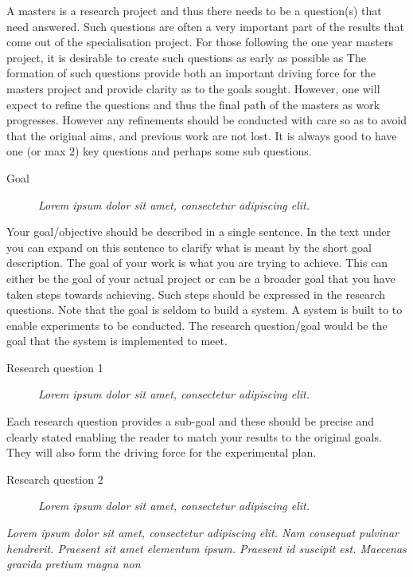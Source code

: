 \documentclass[a4paper]{book}
\begin{document}
A masters is a research project and thus there needs to be a question(s) that need answered. Such questions are often a very important part of the results that come out of the specialisation project. For those following the one year masters project, it is desirable to create such questions as early as possible as   The formation of such questions provide both an important driving force for the masters project and provide clarity as to the goals sought. However, one will expect to refine the questions and thus the final path of the masters as work progresses. However any refinements should be conducted with care so as to avoid that the original aims, and previous work are not lost.
It is always good to have one (or max 2) key questions and perhaps some sub questions.

\begin{description}
    \item[Goal] {\it Lorem ipsum dolor sit amet, consectetur adipiscing elit.}
\end{description}

Your goal/objective should be described in a single sentence. In the text under you can expand on this sentence to clarify what is meant by the short goal description.
The goal of your work is what you are trying to achieve. This can either be the goal of your actual project or can be a broader goal that you have taken steps towards achieving. Such steps should be expressed in the research questions.
Note that the goal is seldom to build a system. A system is built to to enable experiments to be conducted. The research question/goal would be the goal that the system is implemented to meet.


\begin{description}
    \item[Research question 1] {\it Lorem ipsum dolor sit amet, consectetur adipiscing elit.}
\end{description}

Each research question provides a sub-goal and these should be precise and clearly stated enabling the reader to match your results to the original goals. They will also form the driving force for the experimental plan.

\begin{description}
    \item[Research question 2] {\it Lorem ipsum dolor sit amet, consectetur adipiscing elit.}
\end{description}

{\it Lorem ipsum dolor sit amet, consectetur adipiscing elit. Nam consequat pulvinar hendrerit. Praesent sit amet elementum ipsum. Praesent id suscipit est. Maecenas gravida pretium magna non }
\end{document}
